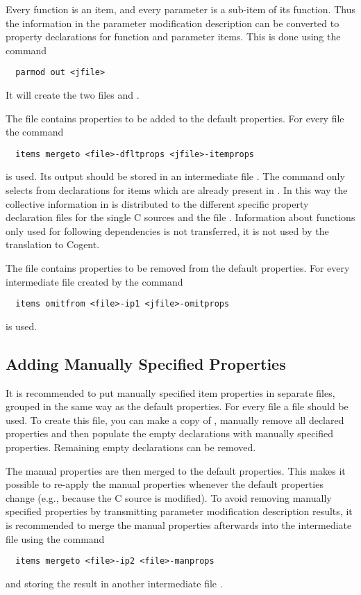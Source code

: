 Every function is an item, and every parameter is a sub-item of its function. Thus the information in the parameter modification
description can be converted to property declarations for function and parameter items. This is done using the command
\begin{verbatim}
  parmod out <jfile>
\end{verbatim}
It will create the two files  and . 

The file  contains properties to be added to the default properties. For every file 
the command 
\begin{verbatim}
  items mergeto <file>-dfltprops <jfile>-itemprops
\end{verbatim}
is used. Its output should be stored in an intermediate file . The command only selects from 
 declarations for items which are already present in
. In this way the collective information in  is distributed to the different
specific property declaration files for the single C sources and the file . Information about functions
only used for following dependencies is not transferred, it is not used by the translation to Cogent.

The file  contains properties to be removed from the default properties. For every intermediate file
 created by  the command 
\begin{verbatim}
  items omitfrom <file>-ip1 <jfile>-omitprops
\end{verbatim}
is used. 

\subsection{Adding Manually Specified Properties}
\label{app-itemprops-manual}

It is recommended to put manually specified item properties in separate files, grouped in the same way as the default 
properties. For every file  a file  should be used. To create this file,
you can make a copy of , manually remove all declared properties and then populate the empty
declarations with manually specified properties. Remaining empty declarations can be removed.

The manual properties are then merged to the default properties. This makes it possible to re-apply the manual properties 
whenever the default properties change (e.g., because the C source is modified). To avoid removing manually specified 
properties by transmitting parameter modification description results, it is recommended to merge the manual properties 
afterwards into the intermediate file  using the command
\begin{verbatim}
  items mergeto <file>-ip2 <file>-manprops
\end{verbatim}
and storing the result in another intermediate file .

